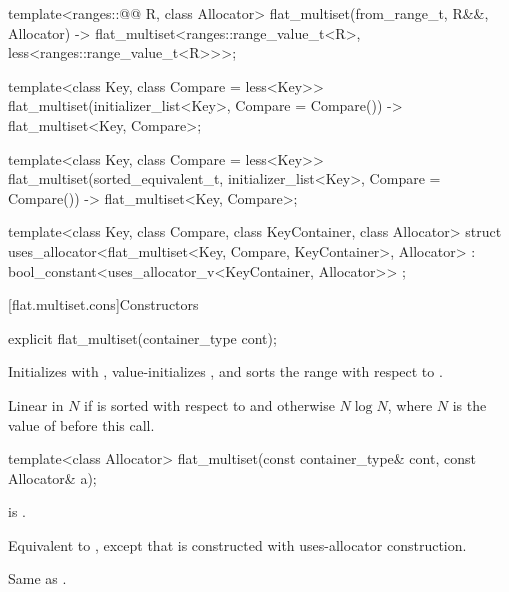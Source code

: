 \begin{codeblock}
{   template<ranges::@@ R, class Allocator>
     flat_multiset(from_range_t, R&&, Allocator)
       -> flat_multiset<ranges::range_value_t<R>, less<ranges::range_value_t<R>>>;

  template<class Key, class Compare = less<Key>>
    flat_multiset(initializer_list<Key>, Compare = Compare())
      -> flat_multiset<Key, Compare>;

  template<class Key, class Compare = less<Key>>
  flat_multiset(sorted_equivalent_t, initializer_list<Key>, Compare = Compare())
      -> flat_multiset<Key, Compare>;

  template<class Key, class Compare, class KeyContainer, class Allocator>
    struct uses_allocator<flat_multiset<Key, Compare, KeyContainer>, Allocator>
      : bool_constant<uses_allocator_v<KeyContainer, Allocator>> { };
}
\end{codeblock}

[flat.multiset.cons]{Constructors}

%
\begin{itemdecl}
explicit flat_multiset(container_type cont);
\end{itemdecl}

\begin{itemdescr}
\pnum
\effects
Initializes  with ,
value-initializes , and
sorts the range  with respect to .

\pnum
\complexity
Linear in $N$ if  is sorted with respect to  and
otherwise $N \log N$, where $N$ is the value of  before this call.
\end{itemdescr}

%
\begin{itemdecl}
template<class Allocator>
  flat_multiset(const container_type& cont, const Allocator& a);
\end{itemdecl}

\begin{itemdescr}
\pnum
\constraints
{} is .

\pnum
\effects
Equivalent to ,
except that  is constructed with
uses-allocator construction.

\pnum
\complexity
Same as .
\end{itemdescr}

